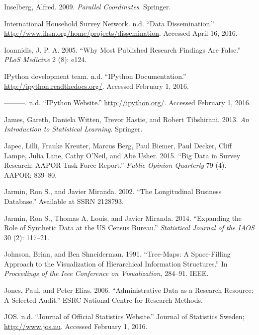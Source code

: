 \documentclass[]{krantz}
\begin{document}
\hypertarget{ref-inselberg2009}{}
Inselberg, Alfred. 2009. \emph{Parallel Coordinates}. Springer.

\hypertarget{ref-InternationalHouseholdSurveyNetwork}{}
International Household Survey Network. n.d. ``Data Dissemination.''
\url{http://www.ihsn.org/home/projects/dissemination}. Accessed April
16, 2016.

\hypertarget{ref-Ioannidis2005}{}
Ioannidis, J. P. A. 2005. ``Why Most Published Research Findings Are
False.'' \emph{PLoS Medicine} 2 (8): e124.

\hypertarget{ref-ipythondoc}{}
IPython development team. n.d. ``IPython Documentation.''
\url{http://ipython.readthedocs.org/}. Accessed February 1, 2016.

\hypertarget{ref-ipython}{}
---------. n.d. ``IPython Website.'' \url{http://ipython.org/}. Accessed
February 1, 2016.

\hypertarget{ref-james2013introduction}{}
James, Gareth, Daniela Witten, Trevor Hastie, and Robert Tibshirani.
2013. \emph{An Introduction to Statistical Learning}. Springer.

\hypertarget{ref-japec2015big}{}
Japec, Lilli, Frauke Kreuter, Marcus Berg, Paul Biemer, Paul Decker,
Cliff Lampe, Julia Lane, Cathy O'Neil, and Abe Usher. 2015. ``Big Data
in Survey Research: AAPOR Task Force Report.'' \emph{Public Opinion
Quarterly} 79 (4). AAPOR: 839--80.

\hypertarget{ref-jarmin2002longitudinal}{}
Jarmin, Ron S., and Javier Miranda. 2002. ``The Longitudinal Business
Database.'' Available at SSRN 2128793.

\hypertarget{ref-jarmin2014expanding}{}
Jarmin, Ron S., Thomas A. Louis, and Javier Miranda. 2014. ``Expanding
the Role of Synthetic Data at the US Census Bureau.'' \emph{Statistical
Journal of the IAOS} 30 (2): 117--21.

\hypertarget{ref-johnson1991tree}{}
Johnson, Brian, and Ben Shneiderman. 1991. ``Tree-Maps: A Space-Filling
Approach to the Visualization of Hierarchical Information Structures.''
In \emph{Proceedings of the Ieee Conference on Visualization}, 284--91.
IEEE.

\hypertarget{ref-jones2006administrative}{}
Jones, Paul, and Peter Elias. 2006. ``Administrative Data as a Research
Resource: A Selected Audit.'' ESRC National Centre for Research Methods.

\hypertarget{ref-JOSweb}{}
JOS. n.d. ``Journal of Official Statistics Website.'' Journal of
Statistics Sweden; \url{http://www.jos.nu}. Accessed February 1, 2016.
\end{document}

